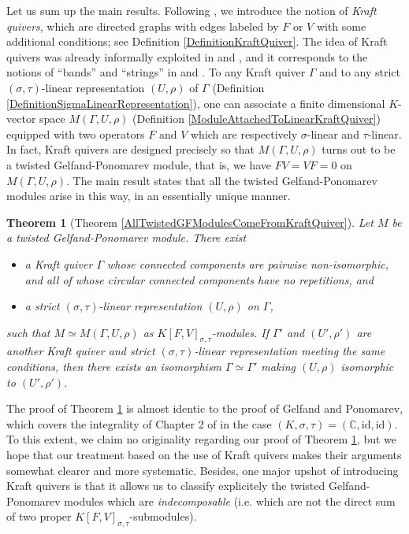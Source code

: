 \documentclass[12pt]{amsart}
\newtheorem{introtheorem}{Theorem}
\theoremstyle{definition}
\newcommand{\<}{\langle}   %
\renewcommand{\>}{\rangle} %
\begin{document}
Let us sum up the main results. Following \cite{chai:kraft2025}, we introduce the notion of \textit{Kraft quivers}, which are directed graphs with edges labeled by $F$ or $V$ with some additional conditions; see Definition \ref{DefinitionKraftQuiver}. The idea of Kraft quivers was already informally exploited in \cite{gelfand-ponomarev:1968} and \cite{kraft:1975}, and it corresponds to the notions of ``bands'' and ``strings'' in \cite{crawley-boevey:2017} and \cite{clannishalgebras:2024}. To any Kraft quiver $\Gamma$ and to any strict $(\sigma,\tau)$-linear representation $(U,\rho)$ of $\Gamma$ (Definition \ref{DefinitionSigmaLinearRepresentation}), one can associate a finite dimensional $K$-vector space $M(\Gamma,U,\rho)$ (Definition \ref{ModuleAttachedToLinearKraftQuiver}) equipped with two operators $F$ and $V$ which are respectively $\sigma$-linear and $\tau$-linear. In fact, Kraft quivers are designed precisely so that $M(\Gamma,U,\rho)$ turns out to be a twisted Gelfand-Ponomarev module, that is, we have $FV = VF = 0$ on $M(\Gamma,U,\rho)$. The main result states that all the twisted Gelfand-Ponomarev modules arise in this way, in an essentially unique manner. 

\begin{introtheorem}[Theorem \ref{AllTwistedGFModulesComeFromKraftQuiver}]\label{IntroTheoremA}
    Let $M$ be a twisted Gelfand-Ponomarev module. There exist
    \begin{itemize}
        \item a Kraft quiver $\Gamma$ whose connected components are pairwise non-isomorphic, and all of whose circular connected components have no repetitions, and 
        \item a strict $(\sigma,\tau)$-linear representation $(U,\rho)$ on $\Gamma$,
    \end{itemize}
    such that $M \simeq M(\Gamma,U,\rho)$ as $K[F,V]_{\sigma,\tau}$-modules. If $\Gamma'$ and $(U',\rho')$ are another Kraft quiver and strict $(\sigma,\tau)$-linear representation meeting the same conditions, then there exists an isomorphism $\Gamma \simeq \Gamma'$ making $(U,\rho)$ isomorphic to $(U',\rho')$.
\end{introtheorem}

The proof of Theorem \ref{IntroTheoremA} is almost identic to the proof of Gelfand and Ponomarev, which covers the integrality of Chapter 2 of \cite{gelfand-ponomarev:1968} in the case $(K,\sigma,\tau) = (\mathbb C,\mathrm{id},\mathrm{id})$. To this extent, we claim no originality regarding our proof of Theorem \ref{IntroTheoremA}, but we hope that our treatment based on the use of Kraft quivers makes their arguments somewhat clearer and more systematic. Besides, one major upshot of introducing Kraft quivers is that it allows us to classify explicitely the twisted Gelfand-Ponomarev modules which are \textit{indecomposable} (i.e. which are not the direct sum of two proper $K[F,V]_{\sigma,\tau}$-submodules). 
\end{document}

